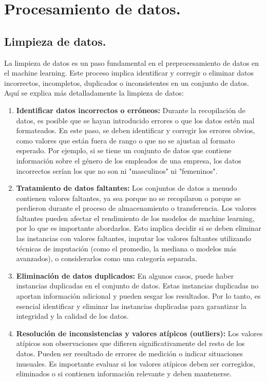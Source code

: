 \documentclass[../main.tex]{subfiles}
\begin{document}
\section{Procesamiento de datos.}

    \subsection*{Limpieza de datos.}
        La limpieza de datos es un paso fundamental en el preprocesamiento de datos en el machine learning. Este proceso implica identificar y corregir o eliminar datos incorrectos, incompletos, duplicados o inconsistentes en un conjunto de datos. Aquí se explica más detalladamente la limpieza de datos:

        \begin{enumerate}
            \item \textbf{Identificar datos incorrectos o erróneos:} Durante la recopilación de datos, es posible que se hayan introducido errores o que los datos estén mal formateados. En este paso, se deben identificar y corregir los errores obvios, como valores que están fuera de rango o que no se ajustan al formato esperado. Por ejemplo, si se tiene un conjunto de datos que contiene información sobre el género de los empleados de una empresa, los datos incorrectos serían los que no son ni "masculinos" ni "femeninos".
            \item \textbf{Tratamiento de datos faltantes:} Los conjuntos de datos a menudo contienen valores faltantes, ya sea porque no se recopilaron o porque se perdieron durante el proceso de almacenamiento o transferencia. Los valores faltantes pueden afectar el rendimiento de los modelos de machine learning, por lo que es importante abordarlos. Esto implica decidir si se deben eliminar las instancias con valores faltantes, imputar los valores faltantes utilizando técnicas de imputación (como el promedio, la mediana o modelos más avanzados), o considerarlos como una categoría separada.
            \item \textbf{Eliminación de datos duplicados:} En algunos casos, puede haber instancias duplicadas en el conjunto de datos. Estas instancias duplicadas no aportan información adicional y pueden sesgar los resultados. Por lo tanto, es esencial identificar y eliminar las instancias duplicadas para garantizar la integridad y la calidad de los datos.
            \item \textbf{Resolución de inconsistencias y valores atípicos (outliers):} Los valores atípicos son observaciones que difieren significativamente del resto de los datos. Pueden ser resultado de errores de medición o indicar situaciones inusuales. Es importante evaluar si los valores atípicos deben ser corregidos, eliminados o si contienen información relevante y deben mantenerse.

\end{enumerate}
\end{document}
